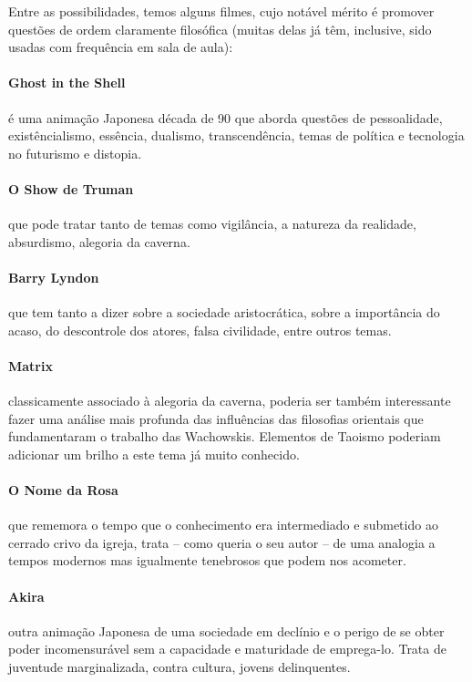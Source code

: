 \documentclass[12pt,a4paper]{article}
\begin{document}
	Entre as possibilidades, temos alguns filmes, cujo notável
	mérito é promover questões de ordem claramente filosófica
	(muitas delas já têm, inclusive, sido usadas com frequência 
	em sala de aula): 

	\paragraph{Ghost in the Shell} é uma animação 
		Japonesa década de 90 que aborda questões de 
		pessoalidade, existêncialismo, essência, 
		dualismo, transcendência, temas de política e 
		tecnologia no futurismo e distopia.

	\paragraph{O Show de Truman} que pode tratar tanto de 
		temas como vigilância, a natureza da realidade,
		absurdismo, alegoria da caverna.

	\paragraph{Barry Lyndon} que tem tanto a dizer sobre a 
		sociedade aristocrática, sobre a importância do
		acaso, do descontrole dos atores, falsa 
		civilidade, entre outros temas.

	\paragraph{Matrix} classicamente associado à alegoria 
		da caverna, poderia ser também interessante 
		fazer uma análise mais profunda das influências 
		das filosofias orientais que fundamentaram o 
		trabalho das Wachowskis. Elementos de Taoismo 
		poderiam adicionar um brilho a este tema já 
		muito conhecido.

	\paragraph{O Nome da Rosa} que rememora o tempo que 
		o conhecimento era intermediado e submetido ao 
		cerrado crivo da igreja, trata -- como queria 
		o seu autor -- de uma analogia a tempos modernos 
		mas igualmente tenebrosos que podem nos acometer.

	\paragraph{Akira} outra animação Japonesa de uma 
		sociedade em declínio e o perigo de se obter 
		poder incomensurável sem a capacidade e 
		maturidade de emprega-lo. Trata de juventude 
		marginalizada, contra cultura, jovens 
		delinquentes.
\end{document}
